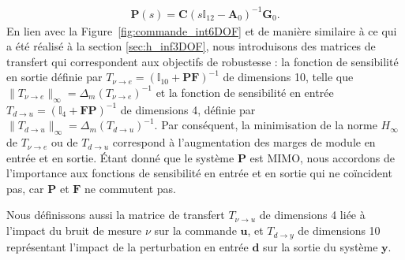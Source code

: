\begin{align*}
    \boldsymbol{P}(s) = \boldsymbol{C} (s \mathbb{I}_{12} - \boldsymbol{A}_{0})^{-1} \boldsymbol{G}_{0}.
\end{align*} 
En lien avec la Figure~\ref{fig:commande_int6DOF} et de manière similaire à ce qui a été réalisé à la section \ref{sec:h_inf3DOF}, nous introduisons des matrices de transfert qui correspondent aux objectifs de robustesse : la fonction de sensibilité en sortie définie par $T_{\nu \rightarrow e}=(\mathbb{I}_{10}+\boldsymbol{P}\boldsymbol{F})^{-1}$ de dimensions 10, telle que $\lVert T_{\nu \rightarrow e} \rVert _{\infty}=\Delta_m(T_{\nu \rightarrow e})^{-1} $ et la fonction de sensibilité en entrée $T_{d \rightarrow u}=(\mathbb{I}_{4}+\boldsymbol{F}\boldsymbol{P})^{-1}$ de dimensions 4, définie par $\lVert T_{d \rightarrow u} \rVert _{\infty}=\Delta_m(T_{d \rightarrow u})^{-1}$.
Par conséquent, la minimisation de la norme $H_{\infty}$ de $T_{\nu \rightarrow e}$ ou de $T_{d \rightarrow u}$ correspond à l'augmentation des marges de module en entrée et en sortie. Étant donné que le système $\boldsymbol{P}$ est MIMO, nous accordons de l'importance aux fonctions de sensibilité en entrée et en sortie qui ne coïncident pas, car $\boldsymbol{P}$ et $\boldsymbol{F}$ ne commutent pas.

Nous définissons aussi la matrice de transfert $T_{\nu \rightarrow u}$ de dimensions 4 liée à l'impact du bruit de mesure $\nu$ sur la commande $\boldsymbol{u}$, et $T_{d \rightarrow y}$ de dimensions 10 représentant l'impact de la perturbation en entrée $\boldsymbol{d}$ sur la sortie du système $\boldsymbol{y}$. 

